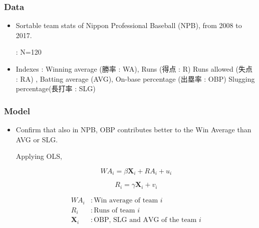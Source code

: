 \documentclass[dvipdfmx,12pt]{beamer}
\begin{document}
\begin{frame}\frametitle{Data}

 \begin{itemize}
 
 \item Sortable team stats of Nippon Professional Baseball (NPB), from 2008 to 2017.
 
 : N=120
 
 \item Indexes : Winning average (勝率 : WA), Runs (得点 : R) Runs allowed (失点 : RA)
 , Batting average (AVG), On-base percentage (出塁率 : OBP) Slugging percentage(長打率 : SLG)
 
 \end{itemize}

\end{frame}

\begin{frame}\frametitle{Model}

 \begin{itemize}
 
 \item Confirm that also in NPB, OBP contributes better to the Win Average than AVG or SLG.
 
 Applying OLS,
 
 \[\textit{WA}_i = \beta \mathbf{X}_i + \textit{RA}_i + u_i \]
 
 \[\textit{R}_i = \gamma \mathbf{X}_i + v_i \]
  
  \begin{align*}
  \textit{WA}_i &: \text{Win average of team } i \\
  \textit{R}_i &: \text{Runs of team } i \\
  \mathbf{X}_i &: \text{OBP, SLG and AVG of the team } i
  \end{align*}
 
 \end{itemize}

\end{frame}
\end{document}
